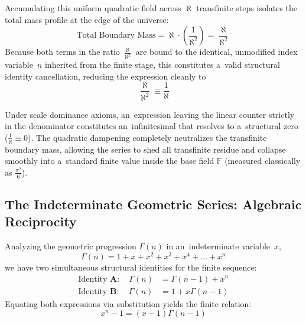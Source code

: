 \documentclass[11pt,a4paper]{article}
\theoremstyle{definition}
\theoremstyle{noperiod}
\begin{document}
Accumulating this uniform quadratic field across $\aleph$ transfinite steps isolates the total mass profile at the edge of the universe:
\begin{equation}
\text{Total Boundary Mass} = \aleph \cdot \left(\frac{1}{\aleph^2}\right) = \frac{\aleph}{\aleph^2}
\end{equation}
Because both terms in the ratio $\frac{\aleph}{\aleph^2}$ are bound to the identical, unmodified index variable~$n$ inherited from the finite stage, this constitutes a~valid structural identity cancellation, reducing the expression cleanly to
\begin{equation}
\frac{\aleph}{\aleph^2} \equiv \frac{1}{\aleph}
\end{equation}

Under scale dominance axioms, an~expression leaving the linear counter strictly in the denominator constitutes an~infinitesimal that resolves to a~structural zero ($\frac{1}{\aleph} \equiv 0$). The quadratic dampening completely neutralizes the transfinite boundary mass, allowing the series to shed all transfinite residue and collapse smoothly into a~standard finite value inside the base field $\mathbb{F}$ (measured classically as $\frac{\pi^2}{6}$).

\subsection{The Indeterminate Geometric Series: Algebraic Reciprocity}

Analyzing the geometric progression $\Gamma(n)$ in an~indeterminate variable~$x$,
\begin{equation}
\Gamma(n) = 1 + x + x^2 + x^3 + x^4 + \dots + x^n
\end{equation}
we have two simultaneous structural identities for the finite sequence:
\begin{align}
\text{Identity~}\mathbf{A}: \quad \Gamma(n) &= \Gamma(n-1) + x^n \\
\text{Identity~}\mathbf{B}: \quad \Gamma(n) &= 1 + x\Gamma(n-1)\end{align}
Equating both expressions via substitution yields the finite relation:
\begin{equation}
x^n - 1 = (x-1)\Gamma(n-1)
\end{equation}
\end{document}
